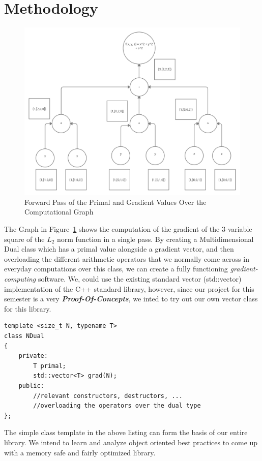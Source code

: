 \documentclass[12pt]{article}
\begin{document}
\section{Methodology}
\begin{center}
\begin{figure}[htb]
	\includegraphics[width=0.8\linewidth, scale=0.6]{graph.jpg}
	\centering
	\caption{Forward Pass of the Primal and Gradient Values
			Over the Computational Graph}
	\label{fig:compgraph}
\end{figure}
\end{center}
The Graph in Figure~\ref{fig:compgraph} shows the computation 
of the gradient of the 3-variable square of the $L_{2}$ norm function 
in a single pass.
By creating a Multidimensional Dual class which has a primal 
value alongside a gradient vector, and then overloading the 
different arithmetic operators that we normally come across 
in everyday computations over this class, we can create a 
fully functioning \emph{gradient-computing} software.
We, could use the existing standard vector (std::vector) implementation
of the C++ standard library, however, since our project for
this semester is a very \textbf{\emph{Proof-Of-Concepts}}, we inted to 
try out our own vector class for this library.
\begin{lstlisting}[caption=How we could create our Dual Number class: ]
template <size_t N, typename T>
class NDual
{
	private: 	
		T primal;
		std::vector<T> grad(N);
	public:
		//relevant constructors, destructors, ...	
		//overloading the operators over the dual type 
};
\end{lstlisting}
The simple class template in the above listing can form the 
basis of our entire library.
We intend to learn and analyze object oriented best practices 
to come up with a memory safe and fairly optimized library.
\end{document}
